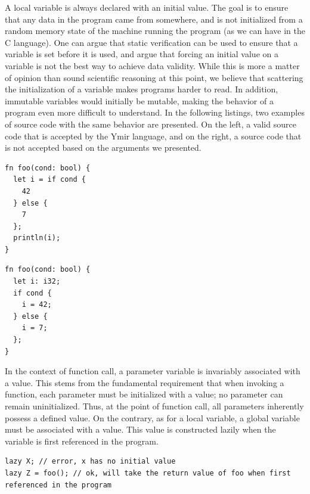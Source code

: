 A local variable is always declared with an initial value. The goal is to ensure
that any data in the program came from somewhere, and is not initialized from a
random memory state of the machine running the program (as we can have in the C
language). One can argue that static verification can be used to ensure that a
variable is set before it is used, and argue that forcing an initial value on a
variable is not the best way to achieve data validity. While this is more a
matter of opinion than sound scientific reasoning at this point, we believe that
scattering the initialization of a variable makes programs harder to read. In
addition, immutable variables would initially be mutable, making the behavior of
a program even more difficult to understand. In the following listings, two
examples of source code with the same behavior are presented. On the left, a
valid source code that is accepted by the Ymir language, and on the right, a
source code that is not accepted based on the arguments we presented.

\hspace{-15pt}%
\begin{minipage}[t][][t]{0.47\linewidth}
  \begin{lstlisting}[style=coloredverbatim, escapechar=@, caption=Valid]
fn foo(cond: bool) {
  let i = if cond {
    42
  } else {
    7
  };
  println(i);
}
  \end{lstlisting}
\end{minipage}\hspace{10pt}%
\begin{minipage}[t][][t]{0.47\linewidth}
  \begin{lstlisting}[style=coloredverbatimError, escapechar=@, caption=Invalid]
fn foo(cond: bool) {
  let i: i32;
  if cond {
    i = 42;
  } else {
    i = 7;
  };
}
  \end{lstlisting}
\end{minipage}

In the context of function call, a parameter variable is invariably associated
with a value. This stems from the fundamental requirement that when invoking a
function, each parameter must be initialized with a value; no parameter can
remain uninitialized. Thus, at the point of function call, all parameters
inherently possess a defined value. On the contrary, as for a local variable, a
global variable must be associated with a value. This value is constructed
lazily when the variable is first referenced in the program.

\begin{lstlisting}[style=coloredverbatimError]
lazy X; // error, x has no initial value
lazy Z = foo(); // ok, will take the return value of foo when first referenced in the program
\end{lstlisting}

